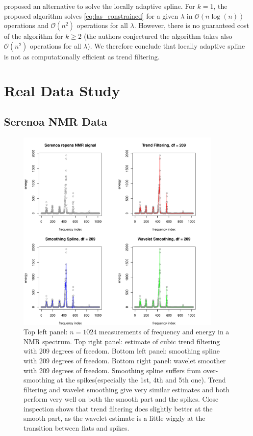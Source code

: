 \documentclass[a4paper]{article}
\renewcommand{\cal}{\mathcal}
\begin{document}
\cite{mammen1997locally} proposed an alternative to solve the locally adaptive spline. For $k = 1$, the proposed algorithm solves \eqref{eq:las_constrained} for a given $\lambda$ in $\cal{O}(n\log(n))$ operations and $\cal{O}(n^2)$ operations for all $\lambda$. However, there is no guaranteed cost of the algorithm for $k\geq 2$ (the authors conjectured the algorithm takes also $\cal{O}(n^2)$ operations for all $\lambda$). We therefore conclude that locally adaptive spline is not as computationally efficient as trend filtering. 

\section{Real Data Study}
\label{sec:real_data}

\subsection{Serenoa NMR Data}
\label{subsec:nmr}

\begin{figure}[t!]
\centering
\includegraphics[width = 0.9\textwidth]{Figures/Figure9.pdf}
\caption{Top left panel: $n=1024$ measurements of frequency and energy in a NMR spectrum. Top right panel: estimate of cubic trend filtering with 209 degrees of freedom. Bottom left panel: smoothing spline with 209 degrees of freedom. Bottom right panel: wavelet smoother with 209 degrees of freedom. Smoothing spline suffers from over-smoothing at the spikes(especially the 1st, 4th and 5th one). Trend filtering and wavelet smoothing give very similar estimates and both perform very well on both the smooth part and the spikes. Close inspection shows that trend filtering does slightly better at the smooth part, as the wavelet estimate is a little wiggly at the transition between flats and spikes.}
\label{fig:Figure_9}
\end{figure}
\end{document}
